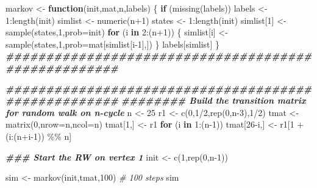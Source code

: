 \documentclass[
]{article}
\newenvironment{Shaded}{\begin{snugshade}}{\end{snugshade}}
\newcommand{\AttributeTok}[1]{\textcolor[rgb]{0.77,0.63,0.00}{#1}}
\newcommand{\CommentTok}[1]{\textcolor[rgb]{0.56,0.35,0.01}{\textit{#1}}}
\newcommand{\ControlFlowTok}[1]{\textcolor[rgb]{0.13,0.29,0.53}{\textbf{#1}}}
\newcommand{\DecValTok}[1]{\textcolor[rgb]{0.00,0.00,0.81}{#1}}
\newcommand{\DocumentationTok}[1]{\textcolor[rgb]{0.56,0.35,0.01}{\textbf{\textit{#1}}}}
\newcommand{\FunctionTok}[1]{\textcolor[rgb]{0.00,0.00,0.00}{#1}}
\newcommand{\NormalTok}[1]{#1}
\newcommand{\OtherTok}[1]{\textcolor[rgb]{0.56,0.35,0.01}{#1}}
\newcommand{\SpecialCharTok}[1]{\textcolor[rgb]{0.00,0.00,0.00}{#1}}
\begin{document}
\begin{Shaded}
\begin{Highlighting}[]
\NormalTok{markov }\OtherTok{\textless{}{-}} \ControlFlowTok{function}\NormalTok{(init,mat,n,labels) \{ }
    \ControlFlowTok{if}\NormalTok{ (}\FunctionTok{missing}\NormalTok{(labels)) labels }\OtherTok{\textless{}{-}} \DecValTok{1}\SpecialCharTok{:}\FunctionTok{length}\NormalTok{(init)}
\NormalTok{simlist }\OtherTok{\textless{}{-}} \FunctionTok{numeric}\NormalTok{(n}\SpecialCharTok{+}\DecValTok{1}\NormalTok{)}
\NormalTok{states }\OtherTok{\textless{}{-}} \DecValTok{1}\SpecialCharTok{:}\FunctionTok{length}\NormalTok{(init)}
\NormalTok{simlist[}\DecValTok{1}\NormalTok{] }\OtherTok{\textless{}{-}} \FunctionTok{sample}\NormalTok{(states,}\DecValTok{1}\NormalTok{,}\AttributeTok{prob=}\NormalTok{init)}
\ControlFlowTok{for}\NormalTok{ (i }\ControlFlowTok{in} \DecValTok{2}\SpecialCharTok{:}\NormalTok{(n}\SpecialCharTok{+}\DecValTok{1}\NormalTok{)) }
\NormalTok{    \{ simlist[i] }\OtherTok{\textless{}{-}} \FunctionTok{sample}\NormalTok{(states,}\DecValTok{1}\NormalTok{,}\AttributeTok{prob=}\NormalTok{mat[simlist[i}\DecValTok{{-}1}\NormalTok{],]) \}}
\NormalTok{labels[simlist]}
\NormalTok{\}}
\DocumentationTok{\#\#\#\#\#\#\#\#\#\#\#\#\#\#\#\#\#\#\#\#\#\#\#\#\#\#\#\#\#\#\#\#\#\#\#\#\#\#\#\#\#\#\#\#\#\#\#\#\#\#\#\#}

\DocumentationTok{\#\#\#\#\#\#\#\#\#\#\#\#\#\#\#\#\#\#\#\#\#\#\#\#\#\#\#\#\#\#\#\#\#\#\#\#\#\#\#\#\#\#\#\#\#\#\#\#\#\#\#\#}
\DocumentationTok{\#\#\#\#\#\#\#\# Build the transition matrix for random walk on n{-}cycle}
\NormalTok{n }\OtherTok{\textless{}{-}} \DecValTok{25}
\NormalTok{r1 }\OtherTok{\textless{}{-}} \FunctionTok{c}\NormalTok{(}\DecValTok{0}\NormalTok{,}\DecValTok{1}\SpecialCharTok{/}\DecValTok{2}\NormalTok{,}\FunctionTok{rep}\NormalTok{(}\DecValTok{0}\NormalTok{,n}\DecValTok{{-}3}\NormalTok{),}\DecValTok{1}\SpecialCharTok{/}\DecValTok{2}\NormalTok{)}
\NormalTok{tmat }\OtherTok{\textless{}{-}} \FunctionTok{matrix}\NormalTok{(}\DecValTok{0}\NormalTok{,}\AttributeTok{nrow=}\NormalTok{n,}\AttributeTok{ncol=}\NormalTok{n)}
\NormalTok{tmat[}\DecValTok{1}\NormalTok{,] }\OtherTok{\textless{}{-}}\NormalTok{ r1 }
\ControlFlowTok{for}\NormalTok{ (i }\ControlFlowTok{in} \DecValTok{1}\SpecialCharTok{:}\NormalTok{(n}\DecValTok{{-}1}\NormalTok{)) tmat[}\DecValTok{26}\SpecialCharTok{{-}}\NormalTok{i,] }\OtherTok{\textless{}{-}}\NormalTok{ r1[}\DecValTok{1} \SpecialCharTok{+}\NormalTok{ (i}\SpecialCharTok{:}\NormalTok{(n}\SpecialCharTok{+}\NormalTok{i}\DecValTok{{-}1}\NormalTok{)) }\SpecialCharTok{\%\%}\NormalTok{ n]}

\DocumentationTok{\#\#\# Start the RW on vertex 1}
\NormalTok{init }\OtherTok{\textless{}{-}} \FunctionTok{c}\NormalTok{(}\DecValTok{1}\NormalTok{,}\FunctionTok{rep}\NormalTok{(}\DecValTok{0}\NormalTok{,n}\DecValTok{{-}1}\NormalTok{))}

\NormalTok{sim }\OtherTok{\textless{}{-}} \FunctionTok{markov}\NormalTok{(init,tmat,}\DecValTok{100}\NormalTok{) }\CommentTok{\# 100 steps}
\NormalTok{sim}
\end{Highlighting}
\end{Shaded}
\end{document}

